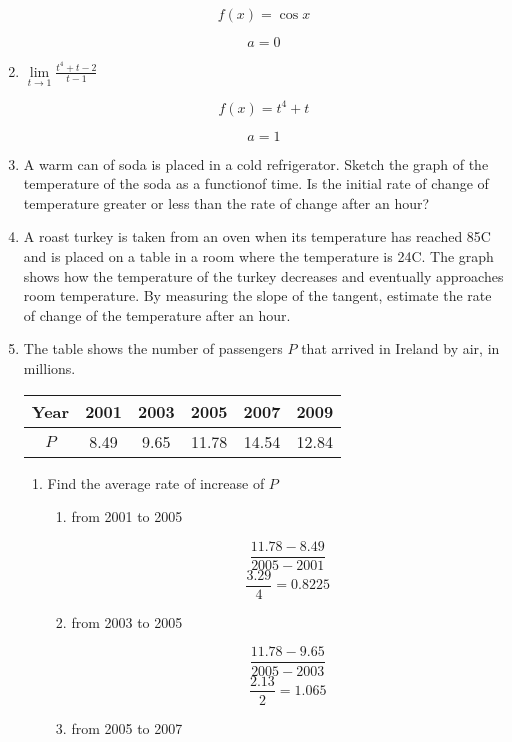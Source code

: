 \documentclass{article}
\begin{document}
\begin{enumerate}
			$$f(x) = \cos x$$

			$$a = 0$$

		\item $\lim \limits _{t \to 1} \frac{t^4 + t - 2}{t-1}$

			$$f(x) = t^4 + t$$

			$$a = 1$$

		\item A warm can of soda is placed in a cold refrigerator. Sketch the
			graph of the temperature of the soda as a functionof time. Is
			the initial rate of change of temperature greater or less than
			the rate of change after an hour?

		\item A roast turkey is taken from an oven when its temperature has reached
			85\degree C and is placed on a table in a room where the temperature is 
			24\degree C. The graph shows how the temperature of the turkey decreases and
			eventually approaches room temperature. By measuring the slope of
			the tangent, estimate the rate of change of the temperature after an
			hour.

		\item The table shows the number of passengers $P$ that arrived in Ireland by air,
			in millions.

		\begin{tabular}{|c|c|c|c|c|c|}
			\hline Year & 2001 & 2003 & 2005 & 2007 & 2009 \\
			\hline $P$ & 8.49 & 9.65 & 11.78 & 14.54 & 12.84 \\
			\hline
		\end{tabular}	

		\begin{enumerate}

			\item Find the average rate of increase of $P$

			\begin{enumerate}
				\item from 2001 to 2005

				$$\frac{11.78 - 8.49}{2005 - 2001}$$
				$$\frac{3.29}{4} = 0.8225$$

				\item from 2003 to 2005

				$$\frac{11.78 - 9.65}{2005 - 2003}$$
				$$\frac{2.13}{2} = 1.065$$

				\item from 2005 to 2007


\end{enumerate}
\end{enumerate}
\end{enumerate}
\end{document}
